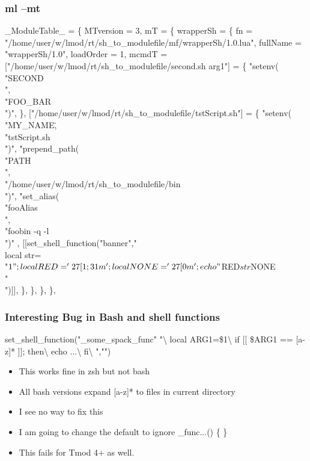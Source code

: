 \documentclass{beamer}
\begin{document}
\begin{frame}[fragile]
  \frametitle{ml --mt}
    {\tiny
\begin{semiverbatim}
\_ModuleTable\_ = \{
  MTversion = 3,
  mT = \{
    wrapperSh = \{
      fn = "/home/user/w/lmod/rt/sh_to_modulefile/mf/wrapperSh/1.0.lua",
      fullName = "wrapperSh/1.0",
      loadOrder = 1,
      mcmdT = {
        ["/home/user/w/lmod/rt/sh_to_modulefile/second.sh arg1"] = \{
          "setenv(\\"SECOND\\",\\"FOO_BAR\\")",
        \},
        ["/home/user/w/lmod/rt/sh_to_modulefile/tstScript.sh"] = \{
          "setenv(\\"MY_NAME\",\\"tstScript.sh\\")",
          "prepend_path(\\"PATH\\",\\"/home/user/w/lmod/rt/sh_to_modulefile/bin\\")",
          "set_alias(\\"fooAlias\\",\\"foobin -q -l\\")"
          , [[set_shell_function("banner"," \\
    local str=\\"$1\\";\\
    local RED='\\27[1;31m';\\
    local NONE='\\27[0m';\\
    echo \\"${RED}${str}${NONE}\\"\\
")]], 
        \},
      \},
    \},
  \},
}
\end{semiverbatim}
    }
\end{frame}

\begin{frame}[fragile]
  \frametitle{Interesting Bug in Bash and shell functions}
    {\tiny
\begin{semiverbatim}
    set_shell_function("_some_spack_func" "\textbackslash
       local ARG1=\$1\textbackslash
       if [[ \$ARG1 == {\color{red}[a-z]*} ]]; then\textbackslash
         echo ...\textbackslash
       fi\textbackslash
    ","")
\end{semiverbatim}
    }
  \begin{itemize}
    \item This works fine in zsh but not bash
    \item All bash versions expand [a-z]\** to files in current directory
    \item I see no way to fix this
    \item I am going to change the default to ignore {\color{blue}\_func...() \{ \}}
    \item This fails for Tmod 4+ as well.
  \end{itemize}
\end{frame}
\end{document}
